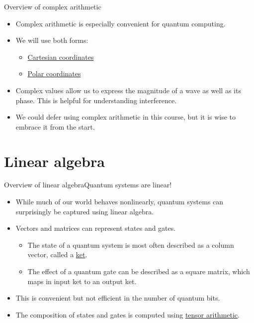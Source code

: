 \begin{frame}{Overview of complex arithmetic}
\begin{itemize}
    \item Complex arithmetic is especially convenient for quantum computing.
    \item We will use both forms:
    \begin{itemize}
        \item \href{https://en.wikipedia.org/wiki/Cartesian_coordinate_system}{Cartesian coordinates}
        \item \href{https://en.wikipedia.org/wiki/Polar_coordinate_system}{Polar coordinates}
    \end{itemize}
    \item Complex values allow us to express the magnitude of a wave as well as its phase.  This is helpful for understanding interference.
    \item We could defer using complex arithmetic in this course, but it is wise to embrace it from the start.
\end{itemize}
    
\end{frame}

\section{Linear algebra}

\begin{frame}{Overview of linear algebra}{Quantum systems are linear!}
\begin{itemize}
    \item While much of our world behaves nonlinearly, quantum systems can surprisingly be captured using linear algebra.
    \item Vectors and matrices can represent states and gates.  
    \begin{itemize}
        \item The state of a quantum system is most often described as a column vector, called a \href{https://en.wikipedia.org/wiki/Bra-ket_notation}{ket}.
         \item The effect of a quantum gate can be described as a square matrix, which maps in input ket to an output ket.
    \end{itemize}
    \item This is convenient but not efficient in the number of quantum bits.
    \item The composition of states and gates is computed using \href{https://en.wikipedia.org/wiki/Tensor}{tensor arithmetic}.
\end{itemize}
    
\end{frame}


